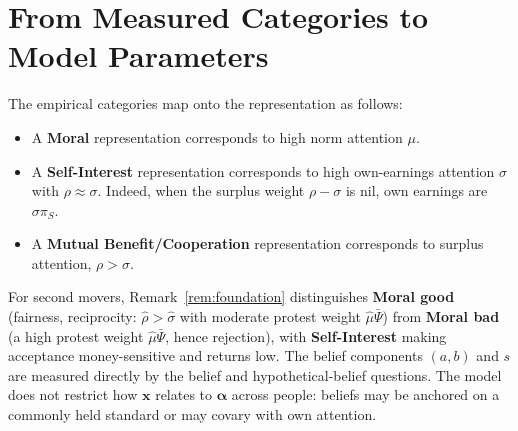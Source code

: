 \documentclass[11pt]{article}
\theoremstyle{plain}
\theoremstyle{remark}
\begin{document}
\section{From Measured Categories to Model Parameters} 

The empirical categories map onto the representation as follows:

\begin{itemize}
\item A \textbf{Moral} representation corresponds to high norm attention $\mu$. 
\item A \textbf{Self-Interest} representation corresponds to high own-earnings attention $\sigma$ with $\rho\approx\sigma$. Indeed, when the surplus weight $\rho-\sigma$ is nil, own earnings are $\sigma\pi_S$. 
\item A \textbf{Mutual Benefit/Cooperation} representation corresponds to surplus attention, $\rho>\sigma$. 
\end{itemize}

For second movers, Remark~\ref{rem:foundation} distinguishes \textbf{Moral good} (fairness, reciprocity: $\hat\rho>\hat\sigma$ with moderate protest weight $\hat\mu\bar\Psi$) from \textbf{Moral bad} (a high protest weight $\hat\mu\bar\Psi$, hence rejection), with \textbf{Self-Interest} making acceptance money-sensitive and returns low. The belief components $(a,b)$ and $s$ are measured directly by the belief and hypothetical-belief questions. The model does not restrict how $\mathbf{x}$ relates to $\boldsymbol{\alpha}$ across people: beliefs may be anchored on a commonly held standard or may covary with own attention. 
\end{document}
